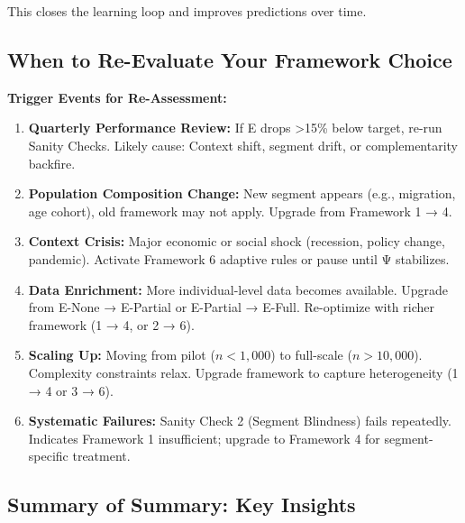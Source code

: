 This closes the learning loop and improves predictions over time.

\subsection{When to Re-Evaluate Your Framework Choice}

\textbf{Trigger Events for Re-Assessment:}

\begin{enumerate}
\item \textbf{Quarterly Performance Review:} If E drops >15\% below target, re-run Sanity Checks. Likely cause: Context shift, segment drift, or complementarity backfire.
\item \textbf{Population Composition Change:} New segment appears (e.g., migration, age cohort), old framework may not apply. Upgrade from Framework 1 → 4.
\item \textbf{Context Crisis:} Major economic or social shock (recession, policy change, pandemic). Activate Framework 6 adaptive rules or pause until Ψ stabilizes.
\item \textbf{Data Enrichment:} More individual-level data becomes available. Upgrade from E-None → E-Partial or E-Partial → E-Full. Re-optimize with richer framework (1 → 4, or 2 → 6).
\item \textbf{Scaling Up:} Moving from pilot ($n < 1,000$) to full-scale ($n > 10,000$). Complexity constraints relax. Upgrade framework to capture heterogeneity (1 → 4 or 3 → 6).
\item \textbf{Systematic Failures:} Sanity Check 2 (Segment Blindness) fails repeatedly. Indicates Framework 1 insufficient; upgrade to Framework 4 for segment-specific treatment.
\end{enumerate}

\subsection{Summary of Summary: Key Insights}


